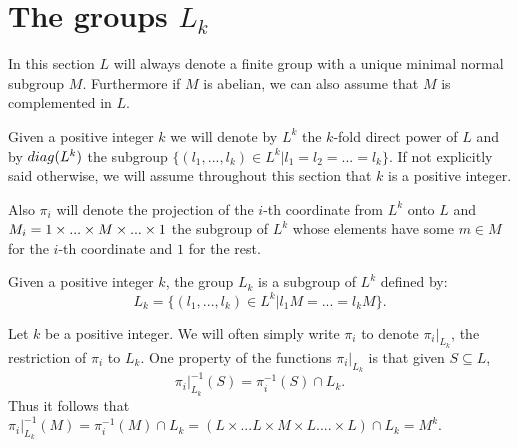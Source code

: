 \chapter{The groups \texorpdfstring{$L_k$}{Lk}} \label{TheGroupsLk}

In this section $L$ will always denote a finite group with a unique minimal normal subgroup $M$. Furthermore if $M$ is abelian, we can also assume that $M$ is complemented in $L$.

Given a positive integer $k$ we will denote by $L^{k}$ the $k$-fold direct power of $L$ and by $diag({L^{k}})$ the subgroup $\{(l_1,...,l_k) \in L^k | l_1 = l_2 = ... = l_k\}$. If not explicitly said otherwise, we will assume throughout this section that $k$ is a positive integer.

Also $\pi_i$ will denote the projection of the $i$-th coordinate from $L^k$ onto $L$ and $M_{i} = 1\times ... \times M \times ... \times 1$ the subgroup of $L^k$ whose elements have some $m \in M$ for the $i$-th coordinate and $1$ for the rest.

\begin{definition}
    Given a positive integer $k$, the group $L_k$ is a subgroup of $L^{k}$ defined by:
    $$
    L_k = \{ (l_1,...,l_k) \in L^k | l_1M = ... = l_kM \}.
    $$
\end{definition}

Let $k$ be a positive integer.
We will often simply write $\pi_i$ to denote $\pi_i|_{L_k}$, the restriction of $\pi_i$ to $L_k$. One property of the functions $\pi_i|_{L_k}$ is that given $S \subseteq L$,
$$
\pi_i|_{L_k}^{-1}(S) = \pi_i^{-1}(S) \cap L_k.
$$
Thus it follows that $\pi_i|_{L_k}^{-1}(M) = \pi_i^{-1}(M) \cap L_k = (L \times ... L \times M \times L .... \times L) \cap L_k = M^k$.








